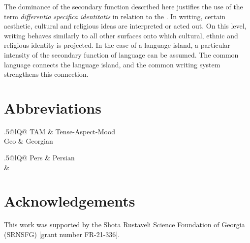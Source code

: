 \documentclass[output=paper,colorlinks,citecolor=brown,arabicfont,georgian]{langscibook}
\begin{document}
The dominance of the secondary function described here justifies the use of the term \textit{differentia specifica identitatis} in relation to the . In writing, certain aesthetic, cultural and religious ideas are interpreted or acted out. On this level, writing behaves similarly to all other surfaces onto which cultural, ethnic and religious identity is projected. In the case of a language island, a particular intensity of the secondary function of language can be assumed. The common language connects the language island, and the common writing system strengthens this connection.

\section*{Abbreviations}
\begin{tabularx}{.5\textwidth}{@{}lQ@{}}
TAM & Tense-Aspect-Mood \\
Geo & Georgian \\
\end{tabularx}%
\begin{tabularx}{.5\textwidth}{@{}lQ@{}}
Pers & Persian \\
& \\
\end{tabularx}

\section*{Acknowledgements}
This work was supported by the Shota Rustaveli  Science Foundation of Georgia (SRNSFG) [grant number FR-21-336].

\sloppy
\printbibliography[heading=subbibliography,notkeyword=this]
\end{document}
